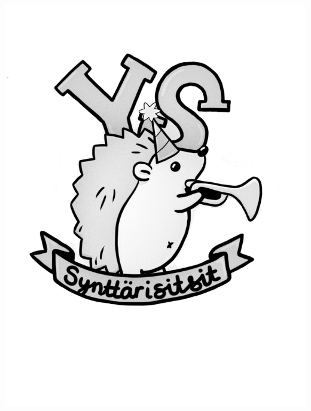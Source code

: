 \documentclass[a4paper,twoside]{book}
\begin{document}
\thispagestyle{empty}
\begin{center}
	\includegraphics[width=\textwidth]{synttarisitsit_logo_bw.jpeg}
\end{center}
\end{document}
